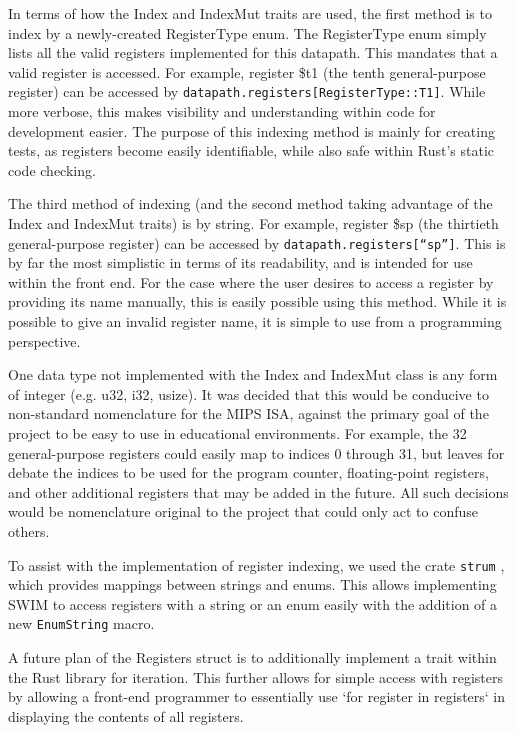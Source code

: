 \documentclass[
    paper=letter,
    parskip=half,
    fontsize=12pt,
    titlepage=firstiscover,
    toc=bibliography,
    numbers=endperiod
]{scrartcl}
\begin{document}
In terms of how the Index and IndexMut traits are used, the first method
is to index by a newly-created RegisterType enum. The RegisterType enum
simply lists all the valid registers implemented for this datapath. This
mandates that a valid register is accessed. For example, register \$t1
(the tenth general-purpose register) can be accessed by
\texttt{datapath.registers[RegisterType::T1]}. While more verbose, this
makes visibility and understanding within code for development easier.
The purpose of this indexing method is mainly for creating tests, as
registers become easily identifiable, while also safe within Rust's
static code checking.

The third method of indexing (and the second method taking advantage of
the Index and IndexMut traits) is by string. For example, register \$sp
(the thirtieth general-purpose register) can be accessed by
\texttt{datapath.registers[``sp'']}. This is by far the most simplistic
in terms of its readability, and is intended for use within the front
end. For the case where the user desires to access a register by
providing its name manually, this is easily possible using this method.
While it is possible to give an invalid register name, it is simple to
use from a programming perspective.

One data type not implemented with the Index and IndexMut class is any
form of integer (e.g. u32, i32, usize). It was decided that this would
be conducive to non-standard nomenclature for the MIPS ISA, against the
primary goal of the project to be easy to use in educational
environments. For example, the 32 general-purpose registers could easily
map to indices 0 through 31, but leaves for debate the indices to be
used for the program counter, floating-point registers, and other
additional registers that may be added in the future. All such decisions
would be nomenclature original to the project that could only act to
confuse others.

To assist with the implementation of register indexing, we used the
crate \texttt{strum} \cite{strum}, which provides mappings between
strings and enums. This allows implementing SWIM to access registers
with a string or an enum easily with the addition of a new
\texttt{EnumString} macro.

A future plan of the Registers struct is to additionally implement a
trait within the Rust library for iteration. This further allows for
simple access with registers by allowing a front-end programmer to
essentially use `for register in registers` in displaying the contents
of all registers.
\end{document}
